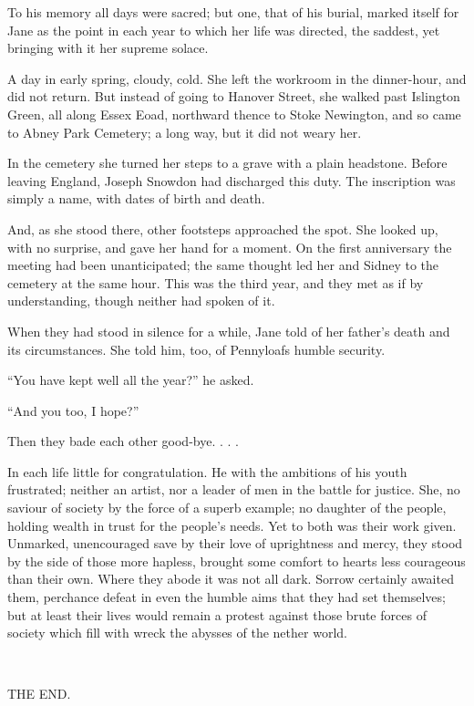 To his memory all days were sacred; but one, that of his burial, marked
itself for Jane as the point in each year to which her life was
directed, the saddest, yet bringing with it her supreme solace.

A day in early spring, cloudy, cold. She left the workroom in the
dinner-hour, and did not return. But instead of going to Hanover Street,
she walked past Islington Green, all {} along Essex Eoad, northward
thence to Stoke Newington, and so came to Abney Park Cemetery; a long
way, but it did not weary her.

In the cemetery she turned her steps to a grave with a plain headstone.
Before leaving England, Joseph Snowdon had discharged this duty. The
inscription was simply a name, with dates of birth and death.

And, as she stood there, other footsteps approached the spot. She looked
up, with no surprise, and gave her hand for a moment. On the first
anniversary the meeting had been unanticipated; the same thought led her
and Sidney to the cemetery at the same hour. This was the third year,
and they met as if by understanding, though neither had spoken of it.

When they had stood in silence for a while, Jane told of her father's
death and its circumstances. She told him, too, of Pennyloafs humble
security.

``You have kept well all the year?'' he asked.

``And you too, I hope?''

Then they bade each other good-bye. . . .

In each life little for congratulation. He {}with the ambitions of his
youth frustrated; neither an artist, nor a leader of men in the battle
for justice. She, no saviour of society by the force of a superb
example; no daughter of the people, holding wealth in trust for the
people's needs. Yet to both was their work given. Unmarked, unencouraged
save by their love of uprightness and mercy, they stood by the side of
those more hapless, brought some comfort to hearts less courageous than
their own. Where they abode it was not all dark. Sorrow certainly
awaited them, perchance defeat in even the humble aims that they had set
themselves; but at least their lives would remain a protest against
those brute forces of society which fill with wreck the abysses of the
nether world.

~

THE END.
